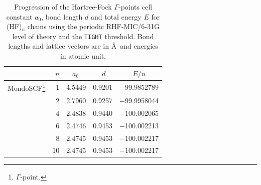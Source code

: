 \documentclass[prl,twocolumn,showpacs,twocolumngrid,superbib]{revtex4}
\begin{document}
\begin{table}[t]
  \centering
  \caption{\protect
    Progression of the Hartree-Fock $\Gamma$-points cell 
    constant $a_0$, bond length $d$ and total energy $E$ for (HF)$_n$ chains
    using the periodic RHF-MIC/6-31G level of theory and the {\tt TIGHT} threshold.
    Bond lengths and lattice vectors are in \AA~and energies in atomic unit.
  }\label{Tab:HF-n}
  \begin{tabular}{lrllc}
    \toprule
    & $n$ & $\;\;\;a_0$ & $\quad\; d$ & $E/n$ \\
    \hline
    {\sc MondoSCF}\footnote[1]{$\Gamma$-point.}
    &                1  & 4.5449 & 0.9201 & $-$99.9852789 \\
    &                2  & 2.7960 & 0.9257 & $-$99.9958044 \\
    &                4  & 2.4838 & 0.9440 & $-$100.002065 \\
    &                6  & 2.4746 & 0.9453 & $-$100.002213 \\
    &                8  & 2.4745 & 0.9453 & $-$100.002217 \\
    &               10  & 2.4745 & 0.9453 & $-$100.002217 \\

\end{tabular}
\end{table}
\end{document}
